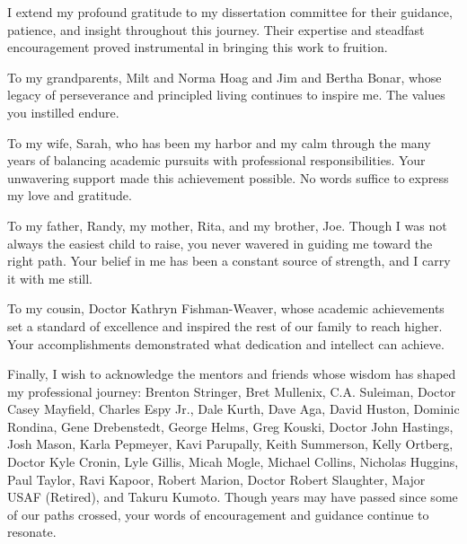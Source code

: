 I extend my profound gratitude to my dissertation committee for their guidance, patience, and insight throughout this journey. Their expertise and steadfast encouragement proved instrumental in bringing this work to fruition.

To my grandparents, Milt and Norma Hoag and Jim and Bertha Bonar, whose legacy of perseverance and principled living continues to inspire me. The values you instilled endure.

To my wife, Sarah, who has been my harbor and my calm through the many years of balancing academic pursuits with professional responsibilities. Your unwavering support made this achievement possible. No words suffice to express my love and gratitude.

To my father, Randy, my mother, Rita, and my brother, Joe. Though I was not always the easiest child to raise, you never wavered in guiding me toward the right path. Your belief in me has been a constant source of strength, and I carry it with me still.

To my cousin, Doctor Kathryn Fishman-Weaver, whose academic achievements set a standard of excellence and inspired the rest of our family to reach higher. Your accomplishments demonstrated what dedication and intellect can achieve.

Finally, I wish to acknowledge the mentors and friends whose wisdom has shaped my professional journey: Brenton Stringer, Bret Mullenix, C.A. Suleiman, Doctor Casey Mayfield, Charles Espy Jr., Dale Kurth, Dave Aga, David Huston, Dominic Rondina, Gene Drebenstedt, George Helms, Greg Kouski, Doctor John Hastings, Josh Mason, Karla Pepmeyer, Kavi Parupally, Keith Summerson, Kelly Ortberg, Doctor Kyle Cronin, Lyle Gillis, Micah Mogle, Michael Collins, Nicholas Huggins, Paul Taylor, Ravi Kapoor, Robert Marion, Doctor Robert Slaughter, Major USAF (Retired), and Takuru Kumoto. Though years may have passed since some of our paths crossed, your words of encouragement and guidance continue to resonate.
\clearpage
